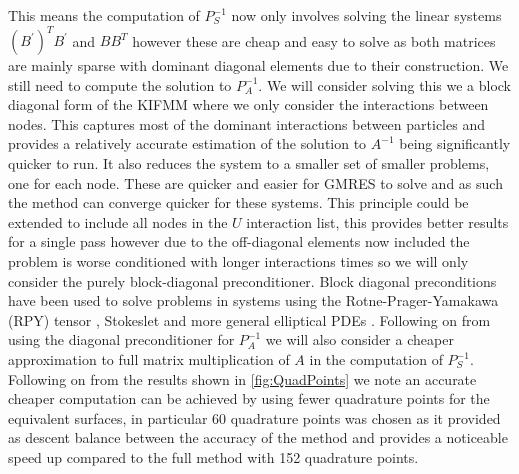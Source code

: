 This means the computation of $P_S^{-1}$ now only involves solving the linear systems $(B^\prime)^TB^\prime$ and $B B^{T}$ however these are cheap and easy to solve as both matrices are mainly sparse with dominant diagonal elements due to their construction. We still need to compute the solution to $P_A^{-1}$. We will consider solving this we a block diagonal form of the KIFMM where we only consider the interactions between nodes. This captures most of the dominant interactions between particles and provides a relatively accurate estimation of the solution to $A^{-1}$ being significantly quicker to run. It also reduces the system to a smaller set of smaller problems, one for each node. These are quicker and easier for GMRES to solve and as such the method can converge quicker for these systems. This principle could be extended to include all nodes in the $U$ interaction list, this provides better results for a single pass however due to the off-diagonal elements now included the problem is worse conditioned with longer interactions times so we will only consider the purely block-diagonal preconditioner. Block diagonal preconditions have been used to solve problems in systems using the Rotne-Prager-Yamakawa (RPY) tensor \cite{UsabiagaHYDRODYNAMICSAPPROACH}, Stokeslet\cite{Nazockdast2017AMechanics} and more general elliptical PDEs \cite{Ibeid2018FastEquations}. Following on from using the diagonal preconditioner for $P_A^{-1}$ we will also consider a cheaper approximation to full matrix multiplication of $A$ in the computation of $P_S^{-1}$. Following on from the results shown in \cref{fig:QuadPoints} we note an accurate cheaper computation can be achieved by using fewer quadrature points for the equivalent surfaces, in particular 60 quadrature points was chosen as it provided as descent balance between the accuracy of the method and provides a noticeable speed up compared to the full method with 152 quadrature points. 

